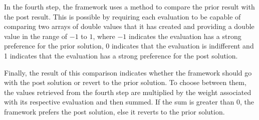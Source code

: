 In the fourth step, the framework uses a method to compare the prior result with the post result. This is possible by requiring each evaluation to be capable of comparing two arrays of double values that it has created and providing a double value in the range of $-1$ to $1$, where $-1$ indicates the evaluation has a strong preference for the prior solution, $0$ indicates that the evaluation is indifferent and 1 indicates that the evaluation has a strong preference for the post solution.

Finally, the result of this comparison indicates whether the framework should go with the post solution or revert to the prior solution. To choose between them, the values retrieved from the fourth step are multiplied by the weight associated with its respective evaluation and then summed. If the sum is greater than 0, the framework prefers the post solution, else it reverts to the prior solution. 